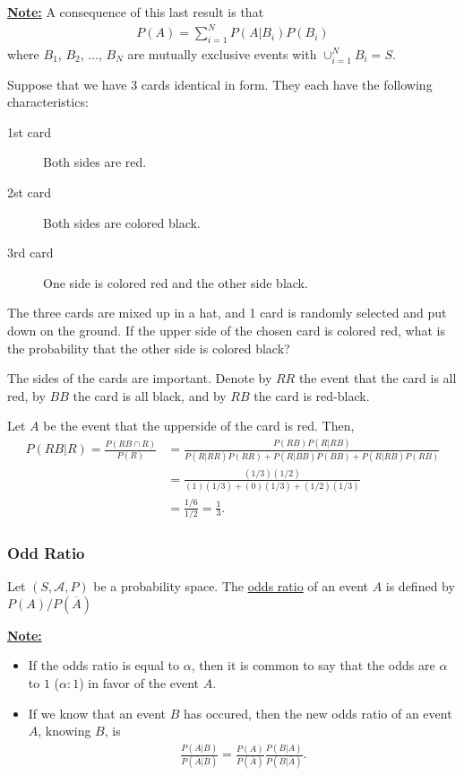 \textbf{\underline{Note:}} A consequence of this last result is that 
	\begin{align*}
	P (A) = \sum_{i = 1}^N P (A | B_i) P (B_i )
	\end{align*}
where $B_1$, $B_2$, $\ldots$, $B_N$ are mutually exclusive events with $\cup_{i = 1}^N B_i = S$.
	
\begin{example}
Suppose that we have $3$ cards identical in form. They each have the following characteristics:
	\begin{description}
	\item[1st card] Both sides are red.
	\item[2st card] Both sides are colored black.
	\item[3rd card] One side is colored red and the other side black.
	\end{description}
The three cards are mixed up in a hat, and 1 card is randomly selected and put down on the ground. If the upper side of the chosen card is colored red, what is the probability that the other side is colored black?
\end{example}

\begin{sol*}
The sides of the cards are important. Denote by $RR$ the event that the card is all red, by $BB$ the card is all black, and by $RB$ the card is red-black.

Let $A$ be the event that the upperside of the card is red. Then,
	\begin{align*}
	P (RB|R) = \frac{P (RB \cap R)}{P(R)} &= \frac{P (RB) P(R|RB)}{P(R|RR)P(RR) + P(R|BB)P(BB) + P(R|RB)P(RB)} \\
	&= \frac{(1/3) (1/2)}{(1) (1/3) + (0) (1/3) + (1/2) (1/3)} \\
	&= \frac{1/6}{1/2} = \frac{1}{3} . \tag*{$\triangle$}
	\end{align*}
\end{sol*}

\subsubsection*{Odd Ratio}

\begin{definition}
Let $(S , \mathcal{A} , P )$ be a probability space. The \underline{odds ratio} of an event $A$ is defined by $P (A)/ P (\overline{A})$
\end{definition}

\underline{\textbf{Note:}} 
\begin{itemize}
\item If the odds ratio is equal to $\alpha$, then it is common to say that the odds are $\alpha$ to $1$ ($\alpha : 1$) in favor of the event $A$. 
\item If we know that an event $B$ has occured, then the new odds ratio of an event $A$, knowing $B$, is
	\begin{align}
	\frac{P (A|B)}{P (\overline{A}|B)} = \frac{P (A)}{P (\overline{A})} \frac{P (B|A)}{P (B|\overline{A})} . \label{Eq:NewOddRatio}
	\end{align}
\end{itemize}

